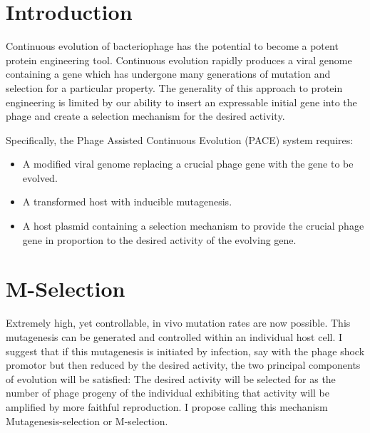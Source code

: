 \documentclass[10pt,letterpaper]{article}
\begin{document}


\section*{Introduction}
Continuous evolution of bacteriophage has the potential to become a potent protein engineering tool\cite{pace}\cite{monsanto}.
Continuous evolution rapidly produces a viral genome containing a gene
which has undergone many generations of mutation and selection for
a particular property.  The generality of this approach to protein engineering
is limited by our ability to insert an expressable initial gene into the phage and create a selection mechanism for the desired activity.

Specifically, the Phage Assisted Continuous Evolution (PACE)\cite{pace} system requires:
\begin{itemize}

\item{}
A modified viral genome replacing a crucial phage gene with the gene to be evolved.

\item{}
A transformed host with inducible mutagenesis.

\item{}
A host plasmid containing a selection mechanism to provide the crucial phage gene in proportion to the desired activity of the evolving gene.
\end{itemize}

\section{M-Selection}
Extremely high, yet controllable, in vivo mutation rates are now possible\cite{mutation}.  This mutagenesis can be generated and controlled within an individual host cell.  I suggest that if this mutagenesis is initiated  by infection, say with the phage shock promotor but then reduced by the desired activity, the two principal components of evolution will be satisfied: The desired activity will be selected for as the number of phage progeny of the individual exhibiting that activity will be amplified by more faithful reproduction.  I propose calling this mechanism Mutagenesis-selection or M-selection.
\end{document}
